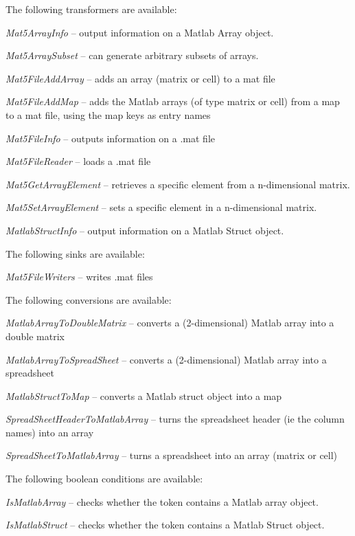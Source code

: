 \documentclass[a4paper]{book}
\begin{document}
The following transformers are available:
\begin{tight_itemize}
  \item \textit{Mat5ArrayInfo} -- output information on a Matlab Array object.
  \item \textit{Mat5ArraySubset} -- can generate arbitrary subsets of arrays.
  \item \textit{Mat5FileAddArray} -- adds an array (matrix or cell) to a mat file
  \item \textit{Mat5FileAddMap} -- adds the Matlab arrays (of type matrix or cell) from a map to a mat file, using the map keys as entry names
  \item \textit{Mat5FileInfo} -- outputs information on a .mat file
  \item \textit{Mat5FileReader} -- loads a .mat file
  \item \textit{Mat5GetArrayElement} -- retrieves a specific element from a n-dimensional matrix.
  \item \textit{Mat5SetArrayElement} -- sets a specific element in a n-dimensional matrix.
  \item \textit{MatlabStructInfo} -- output information on a Matlab Struct object.
\end{tight_itemize}

The following sinks are available:
\begin{tight_itemize}
  \item \textit{Mat5FileWriters} -- writes .mat files
\end{tight_itemize}

The following conversions are available:
\begin{tight_itemize}
  \item \textit{MatlabArrayToDoubleMatrix} -- converts a (2-dimensional) Matlab array into a double matrix
  \item \textit{MatlabArrayToSpreadSheet} -- converts a (2-dimensional) Matlab array into a spreadsheet
  \item \textit{MatlabStructToMap} -- converts a Matlab struct object into a map
  \item \textit{SpreadSheetHeaderToMatlabArray} -- turns the spreadsheet header (ie the column names) into an array
  \item \textit{SpreadSheetToMatlabArray} -- turns a spreadsheet into an array (matrix or cell)
\end{tight_itemize}

The following boolean conditions are available:
\begin{tight_itemize}
  \item \textit{IsMatlabArray} -- checks whether the token contains a Matlab array object.
  \item \textit{IsMatlabStruct} -- checks whether the token contains a Matlab Struct object.
\end{tight_itemize}



\end{document}
